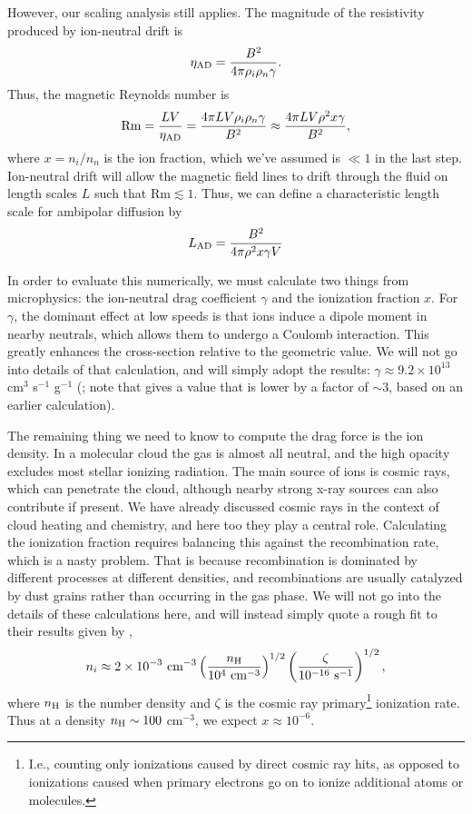 However, our scaling analysis still applies. The magnitude of the resistivity produced by ion-neutral drift is
\begin{equation}
\eta_{\rm AD} = \frac{B^2}{4\pi\rho_i\rho_n\gamma}.
\end{equation}
Thus, the magnetic Reynolds number is
\begin{equation}
\mbox{Rm} = \frac{LV}{\eta_{\rm AD}} = \frac{4\pi L V \rho_i\rho_n\gamma}{B^2} \approx \frac{4\pi L V \rho^2 x\gamma}{B^2},
\end{equation}
where $x=n_i/n_n$ is the ion fraction, which we've assumed is $\ll 1$ in the last step. Ion-neutral drift will allow the magnetic field lines to drift through the fluid on length scales $L$ such that $\mbox{Rm}\lesssim 1$. Thus, we can define a characteristic length scale for ambipolar diffusion by
\begin{equation}
L_{\rm AD} = \frac{B^2}{4\pi\rho^2 x \gamma V}
\end{equation}

In order to evaluate this numerically, we must calculate two things from microphysics: the ion-neutral drag coefficient $\gamma$ and the ionization fraction $x$. For $\gamma$, the dominant effect at low speeds is that ions induce a dipole moment in nearby neutrals, which allows them to undergo a Coulomb interaction. This greatly enhances the cross-section relative to the geometric value. We will not go into details of that calculation, and will simply adopt the results: $\gamma\approx 9.2 \times 10^{13}$ cm$^3$ s$^{-1}$ g$^{-1}$ (\citealt{smith97a}; note that \citealt{shu92a} gives a value that is lower by a factor of $\sim 3$, based on an earlier calculation).

The remaining thing we need to know to compute the drag force is the ion density. In a molecular cloud the gas is almost all neutral, and the high opacity excludes most stellar ionizing radiation. The main source of ions is cosmic rays, which can penetrate the cloud, although nearby strong x-ray sources can also contribute if present. We have already discussed cosmic rays in the context of cloud heating and chemistry, and here too they play a central role. Calculating the ionization fraction requires balancing this against the recombination rate, which is a nasty problem. That is because recombination is dominated by different processes at different densities, and recombinations are usually catalyzed by dust grains rather than occurring in the gas phase. We will not go into the details of these calculations here, and will instead simply quote a rough fit to their results given by \citet{tielens05a},
\begin{equation}
n_i \approx 2\times 10^{-3}\mbox{ cm}^{-3} \left(\frac{n_{\rm H}}{10^4\mbox{ cm}^{-3}}\right)^{1/2} \left(\frac{\zeta}{10^{-16}\mbox{ s}^{-1}}\right)^{1/2},
\end{equation}
where $n_{\rm H}$ is the number density and $\zeta$ is the cosmic ray primary\footnote{I.e., counting only ionizations caused by direct cosmic ray hits, as opposed to ionizations caused when primary electrons go on to ionize additional atoms or molecules.} ionization rate. Thus at a density $n_{\rm H} \sim 100$ cm$^{-3}$, we expect $x\approx 10^{-6}$.

